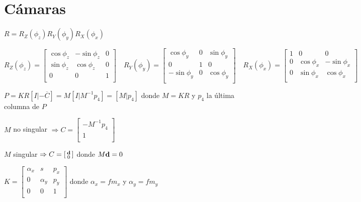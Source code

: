 \documentclass[12pt,a4paper]{article}
\begin{document}
\section{C\'amaras}

$R = R_{Z}(\phi_{z})R_{Y}(\phi_{y})R_{X}(\phi_{x})$

$
R_{Z}(\phi_{z}) =
\left[ {\begin{smallmatrix}
 \cos{\phi_{z}} & -\sin{\phi_{z}} & 0 \\
 \sin{\phi_{z}} & \cos{\phi_{z}} & 0 \\
 0 & 0 & 1\\
\end{smallmatrix} } \right] \quad R_{Y}(\phi_{y}) =
\left[ {\begin{smallmatrix}
	\cos{\phi_{y}} & 0 & \sin{\phi_{y}}\\
	 0 & 1 & 0\\
    -\sin{\phi_{y}} & 0 & \cos{\phi_{y}}\\
\end{smallmatrix} } \right] \quad R_{X}(\phi_{x}) =
\left[ {\begin{smallmatrix}
	1 & 0 & 0\\ 
    0 & \cos{\phi_{x}} & -\sin{\phi_{x}}\\
    0 & \sin{\phi_{x}} & \cos{\phi_{x}}\\
\end{smallmatrix} } \right]
$

$P = KR [I |- \overline{C}] = M[I|M^{-1}p_{4}] = [M|p_{4}]$ donde $M= KR$ y $p_{4}$ la \'ultima columna de $P$

$M$ no singular $\Rightarrow C = \left[ {\begin{smallmatrix}
	-M^{-1}p_{4}\\ 
	 1\\
\end{smallmatrix} } \right]$ 

$M$ singular $\Rightarrow C = \left[ {\begin{smallmatrix}
	{\bf d}\\ 
	0\\
\end{smallmatrix} } \right]$ donde $M {\bf d} = 0$

$
K = \left[ {\begin{smallmatrix}
	\alpha_{x} & s & p_{x}\\ 
    0 & \alpha_{y} & p_{y}\\
    0 & 0 & 1\\
\end{smallmatrix} } \right]
$ donde $\alpha_{x} = f m_{x}$ y  $\alpha_{y} = f m_{y}$
\end{document}
